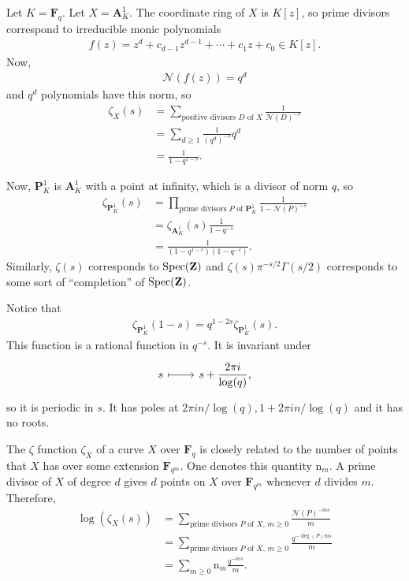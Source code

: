 \documentclass [11 pt, oneside] {article}
\begin{document}
\begin{example}[ ]\label{}\text{}
Let $K = \mathbf{F}_{q}$. Let $X=\mathbf{A}^1_K$. The coordinate ring of $X$ is $K[z]$, so prime divisors correspond to irreducible monic polynomials
\begin{align*}
	f(z) = z^d + c_{d-1}z^{d-1} +\cdots + c_1z +  c_0\in K[z].
\end{align*}
Now,
\begin{align*}
	\mathscr{N}(f(z)) = q^d
\end{align*}
and $q^d$ polynomials have this norm, so
\begin{align*}
	\zeta_X(s) &= \sum_{\textrm{positive divisors $D$ of $X$}}^{} \frac{1}{\mathscr{N}(D) ^{-s}}\\
		   &= \sum_{d\ge 1}^{} \frac{1}{(q^d) ^{-s}}q^d\\
		   &= \frac{1}{1-q^{1-s}}.
\end{align*}

Now, $\mathbf{P}^1_K$ is $\mathbf{A}^1_K$ with a point at infinity, which is a divisor of norm $q$, so
\begin{align*}
	\zeta_{\mathbf{P}^1_K}(s) &= \prod_{\textrm{prime divisors $P$ of $\mathbf{P}^1_K$}} \frac{1}{1-\mathscr{N}(P) ^{-s}}\\
		   &= \zeta_{\mathbf{A}^1_K} (s)  \frac{1}{1-q^{-s}}\\
		   &= \frac{1}{(1-q^{1-s}) (1-q^{-s})}.
\end{align*}
Similarly, $\zeta(s)$ corresponds to $\operatorname{Spec}(\mathbf{Z})$ and $\zeta(s) \pi^{-s/2}\Gamma(s/2)$ corresponds to some sort of ``completion'' of $\operatorname{Spec}(\mathbf{Z})$.

Notice that
\begin{align*}
	\zeta_{\mathbf{P}^1_K}(1-s) = q^{1-2s}\zeta_{\mathbf{P}^1_K} (s).
\end{align*}
This function is a rational function in $q^{-s}$. It is invariant under
\[
\begin{tikzcd}
	s\ar[r,mapsto] & \displaystyle s + \frac{2\pi i}{\log(q)},
\end{tikzcd}
\]
so it is periodic in $s$.
It has poles at $2\pi i n/\log(q), 1+2\pi i n/\log (q)$ and it has no roots.
\end{example}

The $\zeta$ function $\zeta_X$ of a curve $X$ over $\mathbf{F}_{q}$ is closely related to the number of points that $X$ has over some extension $\mathbf{F}_{q^m}$. One denotes this quantity $\mathup{n}_m$.
A prime divisor of $X$ of degree $d$ gives $d$ points on $X$ over $\mathbf{F}_{q^m}$ whenever $d$ divides $m$.
Therefore,
\begin{align*}
	\log(\zeta_X(s)) &= \sum_{\textrm{prime divisors $P$ of $X$, $m\ge 0$}}^{} \frac{\mathscr{N}(P) ^{-ms}}{m}\\
			 &= \sum_{\textrm{prime divisors $P$ of $X$, $m\ge 0$}}^{} \frac{q^{-\deg(P) ms}}{m}\\
			 &= \sum_{m\ge 0}^{} \mathup{n}_m \frac{q^{-ms}}{m}.
\end{align*}	
\end{document}
